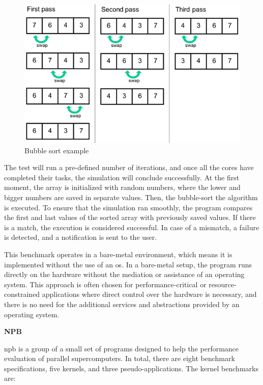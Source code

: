 \begin{figure}[H]
	\centering
 	\includegraphics[width=0.7\linewidth]{Images/bubble_sort.png}
 	\caption{Bubble sort example}
	 \label{fig_bubble_sort}
\end{figure}

The test will run a pre-defined number of iterations, and 
once all the cores have completed their tasks, the simulation will conclude successfully. At the first moment, the array 
is initialized with random numbers, where the lower and bigger numbers are saved in separate values. Then, the bubble-sort 
the algorithm is executed. To ensure that the simulation ran smoothly, the program compares the first and last values of 
the sorted array with previously saved values. If there is a match, the execution is considered successful. In case of a 
mismatch, a failure is detected, and a notification is sent to the user.

This benchmark operates in a bare-metal environment, which means it is implemented without the use of an \gls{os}. In a bare-metal 
setup, the program runs directly on the hardware without the mediation or assistance of an operating system. This approach is often chosen for 
performance-critical or resource-constrained applications where direct control over the hardware is necessary, and there is no need for the 
additional services and abstractions provided by an operating system.
\newline

\textbf{NPB}
\newline

\gls{npb} \cite{bailey1994parallel} is a group of a small set of programs designed to help the performance evaluation of parallel 
supercomputers. In total, there are eight benchmark specifications, five kernels, and three pseudo-applications. The kernel benchmarks are:


